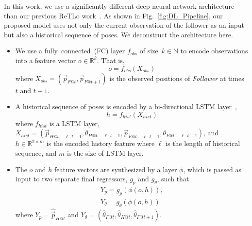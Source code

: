 \documentclass[letterpaper, 10 pt, conference]{ieeeconf}  %
\begin{document}
    In this work, we use a significantly different deep neural network
    architecture than our previous ReTLo work~\cite{CPR17}. As shown in
    Fig.~\ref{fig:DL_Pipeline}, our proposed model uses not only the
    current observation of the follower as an input but also a
    historical sequence of poses. We deconstruct the architecture here.
    \begin{itemize}
        \item We use a fully~connected~(FC) layer $f_{obs}$ of size~$k
            \in \mathbb{N}$ to encode
            observations into a feature vector $o \in \mathbb{R}^k$.
            That is,
            \begin{equation}
                o = f_{obs}(X_{obs})
            \end{equation}
            where $X_{obs} = (\vec{p}_{F@t},\vec{p}_{F@t+1})$ is the
            observed positions of \emph{Follower} at times $t$ and $t+1$.

        \item A historical sequence of poses is encoded by a
            bi-directional LSTM layer~\cite{Wu16},
            \begin{equation}
                h = f_{hist}(X_{hist})
            \end{equation}
            where $f_{hist}$ is a LSTM layer, $X_{hist} =
            (\vec{p}_{H@t-\ell:t-1}, \theta_{H@t-\ell:t-1},
            \vec{p}_{F@t-\ell:t-1}, \theta_{F@t-\ell:t-1})$, and $h \in
            \mathbb{R}^{2 \times m}$ is the encoded history feature
            where $\ell$ is the length of historical sequence, and $m$ is
            the size of LSTM layer.

        \item The $o$ and $h$ feature vectors are synthesized by a layer
           $\phi$, which is passed as input to two separate final
           regressors, $g_{p}$ and $g_\theta$, such that
            \begin{equation}
                \begin{split}
                Y_{p} = g_{p}(\phi(o, h)),\\
                Y_{\theta}= g_{\theta}(\phi(o, h))
                \end{split}
                \label{eq:regression_output}
            \end{equation}
            where $Y_{p} = \hat{\vec{p}}_{H@t}$ and $Y_{\theta} =
            (\hat{\theta}_{F@t}, \hat{\theta}_{H@t},
            \hat{\theta}_{F@t+1})$.


\end{itemize}
\end{document}
